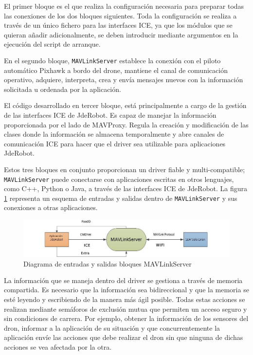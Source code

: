 El primer bloque es el que realiza la configuración necesaria para preparar todas las conexiones de los dos bloques siguientes. Toda la configuración se realiza a través de un único fichero para las interfaces ICE, ya que los módulos que se quieran añadir adicionalmente, se deben introducir mediante argumentos en la ejecución del script de arranque.

En el segundo bloque, \texttt{MAVLinkServer} establece la conexión con el piloto automático Pixhawk a bordo del drone, mantiene el canal de comunicación operativo, adquiere, interpreta, crea y envía mensajes nuevos con la información solicitada u ordenada por la aplicación.

El código desarrollado en tercer bloque, está principalmente a cargo de la gestión de las interfaces ICE de JdeRobot. Es capaz de manejar la información proporcionada por el lado de MAVProxy. Regula la creación y modificación de las clases donde la información se almacena temporalmente y abre canales de comunicación ICE para hacer que el driver sea utilizable para aplicaciones JdeRobot.

Estos tres bloques en conjunto proporcionan un driver fiable y multi-compatible; \texttt{MAVLinkServer} puede conectarse con aplicaciones escritas en otros lenguajes, como C++, Python o Java, a través de las interfaces ICE de JdeRobot. La figura \ref{fig:mavLinkJdeRobotNegra} representa un esquema de entradas y salidas dentro de \texttt{MAVLinkServer} y sus conexiones a otras aplicaciones.


\begin{figure}[H]
  \centering
  \includegraphics[scale=0.65]{imagenes/cajaNegraNueva.png}
  \caption{Diagrama de entradas y salidas bloques MAVLinkServer}
  \label{fig:mavLinkJdeRobotNegra}
\end{figure}

La información que se maneja dentro del driver se gestiona a través de memoria compartida. Es necesario que la información sea bidireccional y que la memoria se esté leyendo y escribiendo de la manera más ágil posible. Todas estas acciones se realizan mediante semáforos de exclusión mutua que permiten un acceso seguro y sin condiciones de carrera. Por ejemplo, obtener la información de los sensores del dron, informar a la aplicación de su situación y que concurrentemente la aplicación envíe las acciones que debe realizar el dron sin que ninguna de dichas acciones se vea afectada por la otra.

